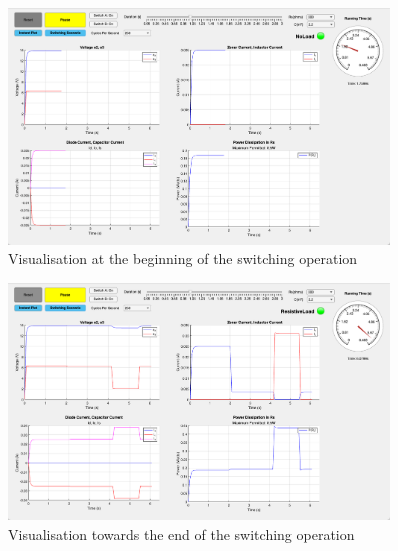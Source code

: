 \begin{figure}[H]
    \centering
   	\includegraphics[width=0.9\textwidth]{graphics/visualisation/switching_1}
	\caption{Visualisation at the beginning of the switching operation}
\end{figure}
\begin{figure}[H]
    \centering
   	\includegraphics[width=0.9\textwidth]{graphics/visualisation/switching_4}
	\caption{Visualisation towards the end of the switching operation}
\end{figure}
